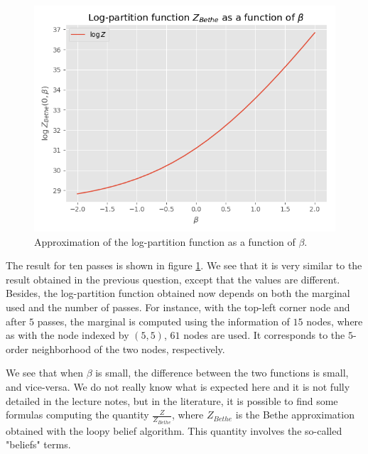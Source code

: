 \documentclass[a4paper, 11pt]{article}
\begin{document}
\begin{enumerate}[resume]
    \begin{figure}[!ht]
        \centering
        \includegraphics[scale=.5]{images/approx_log_partition_beta.png}
        \caption{Approximation of the log-partition function as a function of $\beta$.}
        \label{fig:approx-log-partition}
    \end{figure}
    
    The result for ten passes is shown in figure \ref{fig:approx-log-partition}. We see that it is very similar to the result obtained in the previous question, except that the values are different. Besides, the log-partition function obtained now depends on both the marginal used and the number of passes. For instance, with the top-left corner node and after $5$ passes, the marginal is computed using the information of $15$ nodes, where as with the node indexed by $(5, 5)$, $61$ nodes are used. It corresponds to the $5$-order neighborhood of the two nodes, respectively.
    
    We see that when $\beta$ is small, the difference between the two functions is small, and vice-versa. We do not really know what is expected here and it is not fully detailed in the lecture notes, but in the literature, it is possible to find some formulas computing the quantity $\frac{Z}{Z_{Bethe}}$, where $Z_{Bethe}$ is the Bethe approximation obtained with the loopy belief algorithm. This quantity involves the so-called "beliefs" terms.
\end{enumerate}
\end{document}

